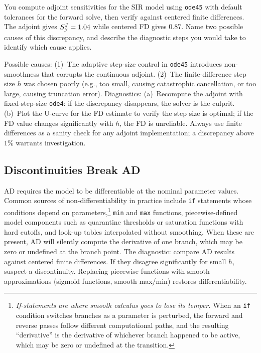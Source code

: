 \begin{selfcheck}
You compute adjoint sensitivities for the SIR model using
\texttt{ode45} with default tolerances for the forward solve,
then verify against centered finite differences.
The adjoint gives $S_{\beta}^{J} = 1.04$ while centered FD gives $0.87$.
Name two possible causes of this discrepancy, and describe
the diagnostic steps you would take to identify which cause applies.
\end{selfcheck}
\begin{scAnswer}
Possible causes: (1)~The adaptive step-size control in \texttt{ode45}
introduces non-smoothness that corrupts the continuous adjoint.
(2)~The finite-difference step size $h$ was chosen poorly (e.g.,
too small, causing catastrophic cancellation, or too large, causing
truncation error). Diagnostics: (a)~Recompute the adjoint with
fixed-step-size \texttt{ode4}: if the discrepancy disappears,
the solver is the culprit. (b)~Plot the U-curve for the FD estimate
to verify the step size is optimal; if the FD value changes
significantly with $h$, the FD is unreliable.
Always use finite differences as a sanity check for any adjoint
implementation; a discrepancy above $1\%$ warrants investigation.
\end{scAnswer}

\subsection{Discontinuities Break AD}

AD requires the model to be differentiable at the nominal parameter values.
Common sources of non-differentiability in practice include \texttt{if} statements
whose conditions depend on parameters,\footnote{%
  \textit{If-statements are where smooth calculus goes to lose its temper.}
  When an \texttt{if} condition switches branches as a parameter is perturbed,
  the forward and reverse passes follow different computational paths,
  and the resulting ``derivative'' is the derivative of whichever branch
  happened to be active, which may be zero or undefined at the transition.}
\texttt{min} and \texttt{max} functions,
piecewise-defined model components such as quarantine thresholds or saturation
functions with hard cutoffs, and look-up tables interpolated without smoothing.
When these are present, AD will silently compute the derivative of one
branch, which may be zero or undefined at the branch point.
The diagnostic: compare AD results against centered finite differences.
If they disagree significantly for small $h$, suspect a discontinuity.
Replacing piecewise functions with smooth approximations (sigmoid
functions, smooth max/min) restores differentiability.

